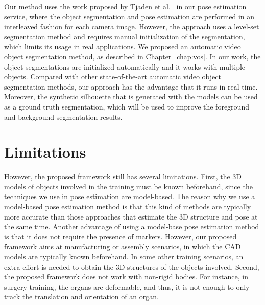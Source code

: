 Our method uses the work proposed by Tjaden et al.~\cite{tjaden2016} in our pose estimation service, where the object segmentation and pose estimation are performed in an interleaved fashion for each camera image.
However, the approach uses a level-set segmentation method and requires manual initialization of the segmentation, which limits its usage in real applications.
We proposed an automatic video object segmentation method, as described in Chapter~\ref{chap:vos}. In our work, the object segmentations are initialized automatically and it works with multiple objects.
Compared with other state-of-the-art automatic video object segmentation methods, our approach has the advantage that it runs in real-time.
Moreover, the synthetic silhouette that is generated with the models can be used as a ground truth segmentation, which will be used to improve the foreground and background segmentation results.

\section{Limitations}

However, the proposed framework still has several limitations.
First, the 3D models of objects involved in the training must be known beforehand, since the techniques we use in pose estimation are model-based.
The reason why we use a model-based pose estimation method is that this kind of methods are typically more accurate than those approaches that estimate the 3D structure and pose at the same time. Another advantage of using a model-base pose estimation method is that it does not require the presence of markers.
However, our proposed framework aims at manufacturing or assembly scenarios, in which the CAD models are typically known beforehand.
In some other training scenarios, an extra effort is needed to obtain the 3D structures of the objects involved.
Second, the proposed framework does not work with non-rigid bodies.
For instance, in surgery training, the organs are deformable, and thus, it is not enough to only track the translation and orientation of an organ.
